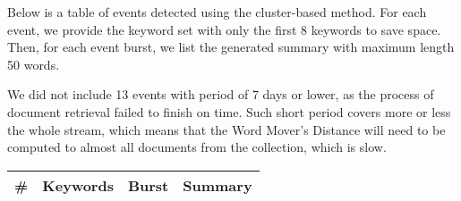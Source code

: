 Below is a table of events detected using the cluster-based method. For each event, we provide the keyword set with only the first 8 keywords to save space. Then, for each event burst, we list the generated summary with maximum length 50 words.

We did not include 13 events with period of 7 days or lower, as the process of document retrieval failed to finish on time. Such short period covers more or less the whole stream, which means that the Word Mover's Distance will need to be computed to almost all documents from the collection, which is slow.

\begin{tabularx}{\linewidth}{r m{2.5cm} X m{8cm}}\toprule[1.5pt]
\bf \# & \bf Keywords & \bf Burst & \bf Summary \\ \midrule


\end{tabularx}
